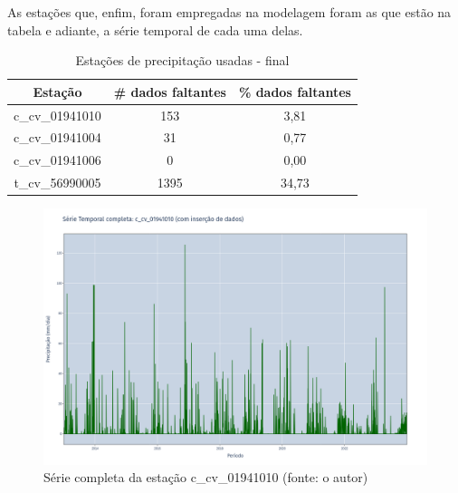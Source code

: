 As estações que, enfim, foram empregadas na modelagem foram as que estão na tabela e adiante, a série temporal de cada uma delas.

\begin{table}[h!]
\centering \small
\caption{Estações de precipitação usadas - final}
\begin{tabular}{|c|c|c|} \hline
\textbf{Estação}&  \textbf{\# dados faltantes}& \textbf{\% dados faltantes} \\ \hline
c\_cv\_01941010 & 153  & 3,81 \\ \hline
c\_cv\_01941004 & 31   & 0,77 \\ \hline
c\_cv\_01941006 & 0    & 0,00 \\ \hline
t\_cv\_56990005 & 1395 & 34,73 \\ \hline
\end{tabular}
\label{tab:estacoes_chuva_usadas_final_rio_doce}
\end{table}

\begin{figure}[!h]
\centering
\includegraphics[scale=0.25]{Figuras/rio_doce/rioDoceSerie_c_cv_01941010_completa.png}
\caption{Série completa da estação c\_cv\_01941010 (fonte: o autor)}
\label{fig:rioDoceSerie_c_cv_01941010_completa}
\end{figure}

